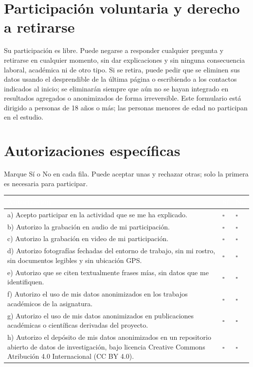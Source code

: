 \documentclass[11pt,a4paper]{article}
\newcommand{\caja}{$\square$}
\begin{document}
\section{Participación voluntaria y derecho a retirarse}
Su participación es libre. Puede negarse a responder cualquier pregunta y retirarse en cualquier momento, sin dar explicaciones y sin ninguna consecuencia laboral, académica ni de otro tipo. Si se retira, puede pedir que se eliminen sus datos usando el desprendible de la última página o escribiendo a los contactos indicados al inicio; se eliminarán siempre que aún no se hayan integrado en resultados agregados o anonimizados de forma irreversible. Este formulario está dirigido a personas de 18 años o más; las personas menores de edad no participan en el estudio.

\clearpage
\section{Autorizaciones específicas}
Marque Sí o No en cada fila. Puede aceptar unas y rechazar otras; solo la primera es necesaria para participar.

{\small
\renewcommand{\arraystretch}{1.35}
\begin{tabularx}{\linewidth}{|X|>{\centering\arraybackslash}p{1.2cm}|>{\centering\arraybackslash}p{1.2cm}|}
\hline
\rowcolor{verde}\textcolor{white}{\textbf{Autorización}} & \textcolor{white}{\textbf{Sí}} & \textcolor{white}{\textbf{No}} \\ \hline
a) Acepto participar en la actividad que se me ha explicado. & \caja & \caja \\ \hline
b) Autorizo la grabación en audio de mi participación. & \caja & \caja \\ \hline
c) Autorizo la grabación en video de mi participación. & \caja & \caja \\ \hline
d) Autorizo fotografías fechadas del entorno de trabajo, sin mi rostro, sin documentos legibles y sin ubicación GPS. & \caja & \caja \\ \hline
e) Autorizo que se citen textualmente frases mías, sin datos que me identifiquen. & \caja & \caja \\ \hline
f) Autorizo el uso de mis datos anonimizados en los trabajos académicos de la asignatura. & \caja & \caja \\ \hline
g) Autorizo el uso de mis datos anonimizados en publicaciones académicas o científicas derivadas del proyecto. & \caja & \caja \\ \hline
h) Autorizo el depósito de mis datos anonimizados en un repositorio abierto de datos de investigación, bajo licencia Creative Commons Atribución 4.0 Internacional (CC BY 4.0). & \caja & \caja \\ \hline
\end{tabularx}
}
\end{document}
